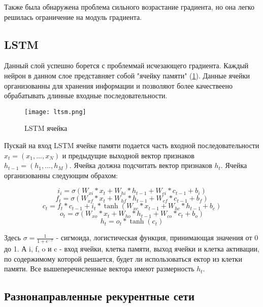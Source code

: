 Также была обнаружена проблема сильного возрастание градиента, но она легко решилась ограничение на модуль градиента.

\subsection{LSTM}

Данный слой успешно борется с проблеммай исчезающего градиента. Каждый нейрон в данном слое представняет собой "ячейку памяти" (\ref{ris:ltsm}). Данные ячейки организованны для хранения информации и позволяют более качествеено обрабатывать длинные входные последовательности.

\begin{figure}[h]
\begin{center}
	\texttt{[image: ltsm.png]}
	\caption{LSTM ячейка}
	\label{ris:ltsm}
\end{center}
\end{figure}


Пускай на вход LSTM ячейке памяти подается часть входной последовательности $x_t = (x_1, ..., x_N)$ и предыдущие выходной вектор признаков $h_{t-1} = (h_1, ..., h_M)$. Ячейка должна подсчитать вектор признаков $h_t$. Ячейка организованны следующим обрахом:


\begin{equation}
	i_i = \sigma(W_{xi}*x_t+W_{hi}*h_{t-1}+W_{ci}*c_{t-1}+b_i)
\end{equation}
\begin{equation}
	f_t = \sigma(W_{xf}*x_t+W_{hf}*h_{t-1}+W_{cf}*c_{t-1}+b_f)
\end{equation}
\begin{equation}
	c_t = f_t*c_{t-1}+i_t*\tanh(W_{xc}*x_{t-1}+W_{hc}*h_{t-1}+b_c)
\end{equation}
\begin{equation}
	o_t = \sigma(W_{xo}*x_t+W_{ho}*h_{t-1}+W_{co}*c_t+b_o)
\end{equation}
\begin{equation}
	h_t = o_t*\tanh(c_t)
\end{equation}

Здесь $\sigma = \frac{1}{1+e^{-x}} $ - сигмоида, логистическая функция, принимающая значения от 0 до 1. А i, f, o и c - вход ячейки, клетка памяти, выход ячейки и клетка активации, по содержимому которой решается, будет ли использоваться ектор из клетки памяти. Все вышеперечисленные вектора имеют размерность $h_t$.

\subsection{Разнонаправленные рекурентные сети}